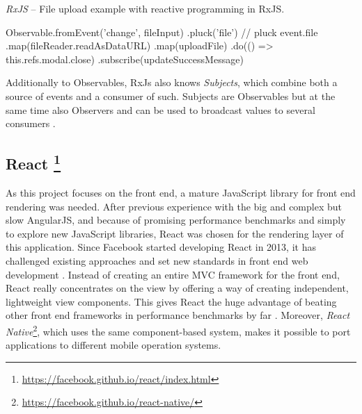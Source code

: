 \begin{program}
\caption{\emph{RxJS} -- File upload example with reactive programming in RxJS.}
\label{prog:implementation-technologies-rxjs}
\begin{JsCode}
Observable.fromEvent('change', fileInput)
  .pluck('file') // pluck event.file
  .map(fileReader.readAsDataURL)
  .map(uploadFile)
  .do(() => this.refs.modal.close)
  .subscribe(updateSuccessMessage)
\end{JsCode}
\end{program}

Additionally to Observables, RxJs also knows \emph{Subjects}, which combine both a source of events and a consumer of such. Subjects are Observables but at the same time also Observers and can be used to broadcast values to several consumers \cite{rxjs-docu}.

\subsection[React]%
             {React%
             \protect\footnote{\url{https://facebook.github.io/react/index.html}}}%
\label{sec:implementation-technologies-react}

As this project focuses on the front end, a mature JavaScript library for front end rendering was needed. After previous experience with the big and complex but slow AngularJS, and because of promising performance benchmarks \cite{react-benchmarks} and simply to explore new JavaScript libraries, React was chosen for the rendering layer of this application. Since Facebook started developing React in 2013, it has challenged existing approaches and set new standards in front end web development \cite{introduction-to-react}. Instead of creating an entire MVC framework for the front end, React really concentrates on the view by offering a way of creating independent, lightweight view components. This gives React the huge advantage of beating other front end frameworks in performance benchmarks by far \cite{react-benchmarks}. Moreover, \emph{React Native}\footnote{\url{https://facebook.github.io/react-native/}}, which uses the same component-based system, makes it possible to port applications to different mobile operation systems.


